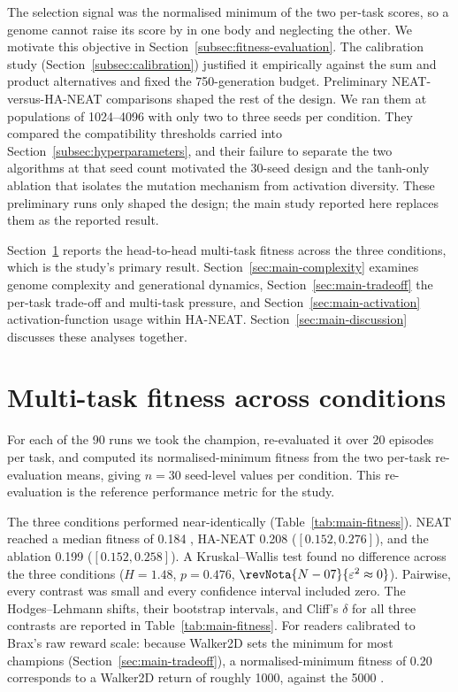 The selection signal was the normalised minimum of the two per-task scores, so a genome cannot raise its score by  in one body and neglecting the other.
We motivate this objective in Section~\ref{subsec:fitness-evaluation}. The calibration study (Section~\ref{subsec:calibration}) justified it empirically against the sum and product alternatives and fixed the 750-generation budget.
Preliminary NEAT-versus-HA-NEAT comparisons shaped the rest of the design. We ran them at populations of 1024--4096 with only two to three seeds per condition. They compared the compatibility thresholds carried into Section~\ref{subsec:hyperparameters}, and their failure to separate the two algorithms at that seed count motivated the 30-seed design and the tanh-only ablation that isolates the mutation mechanism from activation diversity. These preliminary runs only shaped the design; the main study reported here replaces them as the reported result.

Section~\ref{sec:main-study} reports the head-to-head multi-task fitness across the three conditions, which is the study's primary result.
Section~\ref{sec:main-complexity} examines genome complexity and generational dynamics, Section~\ref{sec:main-tradeoff} the per-task trade-off and multi-task pressure, and Section~\ref{sec:main-activation} activation-function usage within HA-NEAT.
Section~\ref{sec:main-discussion} discusses these analyses together.

\section{Multi-task fitness across conditions}
\label{sec:main-study}
For each of the 90 runs we took the champion, re-evaluated it over 20 episodes per task, and computed its normalised-minimum fitness from the two per-task re-evaluation means, giving $n = 30$ seed-level values per condition.
This re-evaluation is the reference performance metric for the study.

The three conditions performed near-identically (Table~\ref{tab:main-fitness}).
NEAT reached a median fitness of 0.184 , HA-NEAT 0.208 ($[0.152, 0.276]$), and the ablation 0.199 ($[0.152, 0.258]$).
A Kruskal--Wallis test found no difference across the three conditions ($H = 1.48$, $p = 0.476$, $\revNota{N-07}{\varepsilon^2 \approx 0}$).
Pairwise, every contrast was small and every confidence interval included zero. The Hodges--Lehmann shifts, their bootstrap intervals, and Cliff's $\delta$ for all three contrasts are reported in Table~\ref{tab:main-fitness}.
For readers calibrated to Brax's raw reward scale: because Walker2D sets the minimum for most champions (Section~\ref{sec:main-tradeoff}), a normalised-minimum fitness of 0.20 corresponds to a Walker2D return of roughly 1000, against the 5000 .

